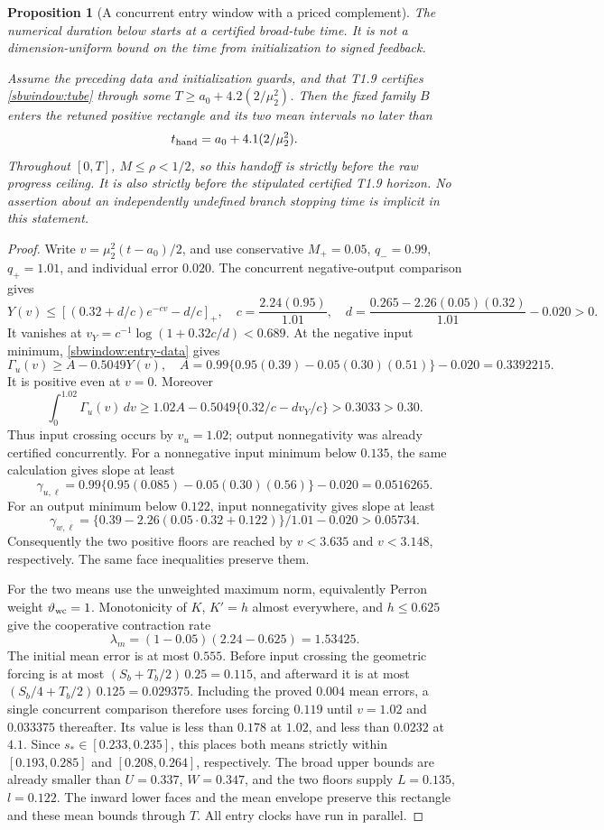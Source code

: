 \documentclass{article} %
\theoremstyle{plain}
\newtheorem{proposition}[theorem]{Proposition}
\theoremstyle{definition}
\theoremstyle{remark}
\begin{document}
\begin{proposition}[A concurrent entry window with a priced complement]
\label{sbwindow:entry}
The numerical duration below starts at a certified broad-tube time. It is not a dimension-uniform bound on the time from initialization to signed feedback.

Assume the preceding data and initialization guards, and that T1.9
certifies \eqref{sbwindow:tube} through some
$T\ge a_0+4.2(2/\mu_2^2)$. Then the fixed family $B$ enters the retuned
positive rectangle and its two mean intervals no later than
\[
 t_{\rm hand}=a_0+4.1(2/\mu_2^2).
\]
Throughout $[0,T]$, $M\le\rho<1/2$, so this handoff is strictly before
the raw progress ceiling. It is also strictly before the stipulated
certified T1.9 horizon. No assertion about an independently undefined
branch stopping time is implicit in this statement.
\end{proposition}
\begin{proof}
Write $v=\mu_2^2(t-a_0)/2$, and use conservative $M_+=0.05$,
$q_-=0.99$, $q_+=1.01$, and individual error $0.020$.
The concurrent negative-output comparison gives
\[
 Y(v)\le[(0.32+d/c)e^{-cv}-d/c]_+,\quad
 c=\frac{2.24(0.95)}{1.01},\quad
 d=\frac{0.265-2.26(0.05)(0.32)}{1.01}-0.020>0.
\]
It vanishes at $v_Y=c^{-1}\log(1+0.32c/d)<0.689$.
At the negative input minimum, \eqref{sbwindow:entry-data} gives
\[
 \Gamma_u(v)\ge A-0.5049Y(v),\quad
 A=0.99\{0.95(0.39)-0.05(0.30)(0.51)\}-0.020=0.3392215.
\]
It is positive even at $v=0$. Moreover
\[
 \int_0^{1.02}\Gamma_u(v)\,dv
 \ge1.02A-0.5049\{0.32/c-dv_Y/c\}>0.3033>0.30.
\]
Thus input crossing occurs by $v_u=1.02$; output nonnegativity was already
certified concurrently. For a nonnegative input minimum below $0.135$,
the same calculation gives slope at least
\[
 \gamma_{u,\ell}=0.99\{0.95(0.085)-0.05(0.30)(0.56)\}-0.020
                  =0.0516265.
\]
For an output minimum below $0.122$, input nonnegativity gives slope at
least
\[
 \gamma_{w,\ell}=\{0.39-2.26(0.05\cdot0.32+0.122)\}/1.01-0.020
                  >0.05734.
\]
Consequently the two positive floors are reached by $v<3.635$ and
$v<3.148$, respectively. The same face inequalities preserve them.

For the two means use the unweighted maximum norm, equivalently Perron
weight $\vartheta_{\rm wc}=1$. Monotonicity of $K$, $K'=h$ almost
everywhere, and $h\le0.625$ give the cooperative contraction rate
\[
 \lambda_m=(1-0.05)(2.24-0.625)=1.53425.
\]
The initial mean error is at most $0.555$. Before input crossing the
geometric forcing is at most
$(S_b+T_b/2)\,0.25=0.115$, and afterward it is at most
$(S_b/4+T_b/2)\,0.125=0.029375$.
Including the proved $0.004$ mean errors, a single concurrent comparison
therefore uses forcing $0.119$ until $v=1.02$ and $0.033375$ thereafter.
Its value is less than $0.178$ at $1.02$, and less than $0.0232$ at $4.1$.
Since $s_*\in[0.233,0.235]$, this places both means strictly within
$[0.193,0.285]$ and $[0.208,0.264]$, respectively. The broad upper bounds
are already smaller than $U=0.337$, $W=0.347$, and the two floors supply
$L=0.135$, $l=0.122$. The inward lower faces and the mean envelope preserve this rectangle
and these mean bounds through $T$. All entry clocks have run in parallel.
\end{proof}
\end{document}
